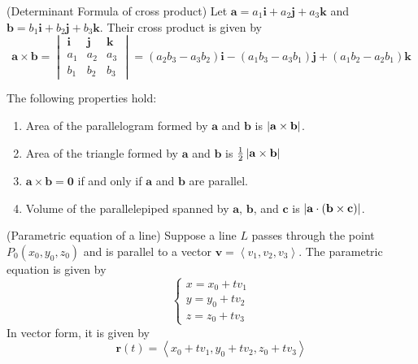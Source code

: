 \documentclass{huhtakm-template-book}
\begin{document}
\begin{thm}(Determinant Formula of cross product)
    Let $\mathbf{a}=a_{1}\mathbf{i}+a_{2}\mathbf{j}+a_{3}\mathbf{k}$ and $\mathbf{b}=b_{1}\mathbf{i}+b_{2}\mathbf{j}+b_{3}\mathbf{k}$. Their cross product is given by
    \begin{equation*}
        \mathbf{a}\times\mathbf{b}=\begin{vmatrix}
            \mathbf{i} & \mathbf{j} & \mathbf{k}\\
            a_{1} & a_{2} & a_{3}\\
            b_{1} & b_{2} & b_{3}
        \end{vmatrix}=(a_{2}b_{3}-a_{3}b_{2})\mathbf{i}-(a_{1}b_{3}-a_{3}b_{1})\mathbf{j}+(a_{1}b_{2}-a_{2}b_{1})\mathbf{k}
    \end{equation*}
\end{thm}
\begin{lem}
    The following properties hold:
    \begin{enumerate}
        \item Area of the parallelogram formed by $\mathbf{a}$ and $\mathbf{b}$ is $\left|{\mathbf{a}\times\mathbf{b}}\right|$.
        \item Area of the triangle formed by $\mathbf{a}$ and $\mathbf{b}$ is $\frac{1}{2}\left|{\mathbf{a}\times\mathbf{b}}\right|$
        \item $\mathbf{a}\times\mathbf{b}=\mathbf{0}$ if and only if $\mathbf{a}$ and $\mathbf{b}$ are parallel.
        \item Volume of the parallelepiped spanned by $\mathbf{a}$, $\mathbf{b}$, and $\mathbf{c}$ is $\left|{\mathbf{a}\cdot(\mathbf{b}\times\mathbf{c})}\right|$.
    \end{enumerate}
\end{lem}
\begin{defn}(Parametric equation of a line)
    Suppose a line $L$ passes through the point $P_{0}(x_{0},y_{0},z_{0})$ and is parallel to a vector $\mathbf{v}=\left<v_{1},v_{2},v_{3}\right>$. The parametric equation is given by
    \begin{equation*}
        \begin{cases}
            x=x_{0}+tv_{1}\\
            y=y_{0}+tv_{2}\\
            z=z_{0}+tv_{3}
        \end{cases}
    \end{equation*}
    In vector form, it is given by
    \begin{equation*}
        \mathbf{r}(t)=\left<x_{0}+tv_{1},y_{0}+tv_{2},z_{0}+tv_{3}\right>
    \end{equation*}
\end{defn}
\end{document}
